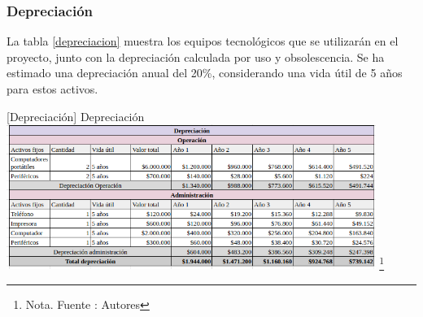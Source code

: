 \subsubsection{Depreciación}

La tabla \ref{depreciacion} muestra los equipos tecnológicos que se utilizarán en el proyecto, junto con la depreciación calculada por uso y obsolescencia. Se ha estimado una depreciación anual del 20\%, considerando una vida útil de 5 años para estos activos.

\vspace{2mm}
\begin{minipage}{0.9\textwidth}
\centering
{}[{Depreciación}]{ Depreciación }
\label{depreciacion}
\includegraphics[width=0.9\textwidth]{Content/Images/AF/amortizacion_Depresiacion.png}
\footnote{Nota. \textup{Fuente : Autores}}
\end{minipage}
